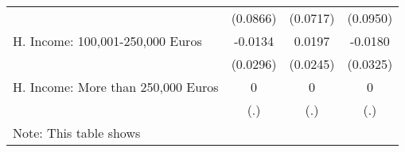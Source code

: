 {\begin{tabular}{l*{3}{c}}
            &    (0.0866)         &    (0.0717)         &    (0.0950)         \\
[1em]
H. Income: 100,001-250,000 Euros&     -0.0134         &      0.0197         &     -0.0180         \\
            &    (0.0296)         &    (0.0245)         &    (0.0325)         \\
[1em]
H. Income: More than 250,000 Euros&           0         &           0         &           0         \\
            &         (.)         &         (.)         &         (.)         \\
\hline\hline
\multicolumn{4}{l}{\footnotesize Note: This table shows}\\
\end{tabular}
}
